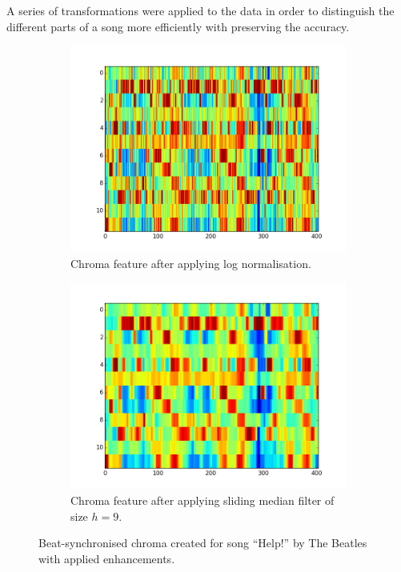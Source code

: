 A series of transformations were applied to the data in order to distinguish the different parts of a song more efficiently with preserving the accuracy.

\begin{figure}[t]
        \centering
        \begin{subfigure}[b]{0.47\textwidth}
                \includegraphics[width=\textwidth]{Figures/hpcp_synched_log_chroma}
                \caption{Chroma feature after applying log normalisation.}
                \label{fig:logchroma}
        \end{subfigure}%
        \begin{subfigure}[b]{0.47\textwidth}
                \includegraphics[width=\textwidth]{Figures/hpcp_synched_median_chroma}
                \caption{Chroma feature after applying sliding median filter of size $h=9$.}
                \label{fig:slidingchroma}
        \end{subfigure}
          \caption{Beat-synchronised chroma created for song ``Help!'' by The Beatles with applied enhancements.}
        \label{fig:chromaenhance}
\end{figure}


